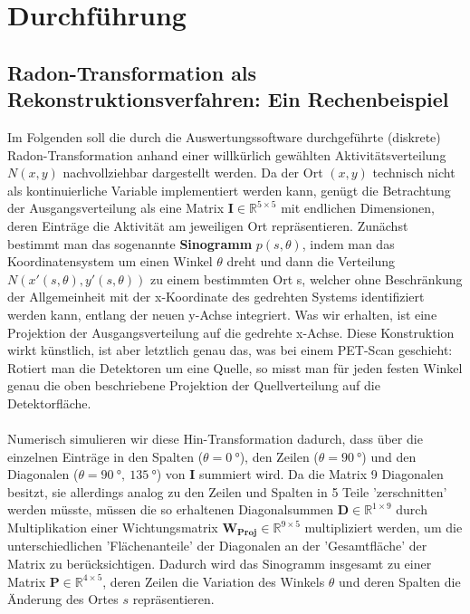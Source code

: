 \section{Durchführung}
\subsection{Radon-Transformation als Rekonstruktionsverfahren: Ein Rechenbeispiel} \label{dfs:Radon}
        Im Folgenden soll die durch die Auswertungssoftware durchgeführte (diskrete) Radon-Transformation anhand einer willkürlich gewählten Aktivitätsverteilung $N(x,y)$ nachvollziehbar dargestellt werden. Da der Ort $(x,y)$ technisch nicht als kontinuierliche Variable implementiert werden kann, genügt die Betrachtung der Ausgangsverteilung als eine Matrix $\boldsymbol{I} \in \mathbb{R}^{5 \times 5}$ mit endlichen Dimensionen, deren Einträge die Aktivität am jeweiligen Ort repräsentieren. Zunächst bestimmt man das sogenannte \textbf{Sinogramm} $p(s, \theta)$, indem man das Koordinatensystem um einen Winkel $\theta$ dreht und dann die Verteilung $N(x'(s,\theta),y'(s,\theta))$ zu einem bestimmten Ort s, welcher ohne Beschränkung der Allgemeinheit mit der x-Koordinate des gedrehten Systems identifiziert werden kann, entlang der neuen y-Achse integriert. Was wir erhalten, ist eine Projektion der Ausgangsverteilung auf die gedrehte x-Achse. Diese Konstruktion wirkt künstlich, ist aber letztlich genau das, was bei einem PET-Scan geschieht: Rotiert man die Detektoren um eine Quelle, so misst man für jeden festen Winkel genau die oben beschriebene Projektion der Quellverteilung auf die Detektorfläche.\\
        \ \\
         Numerisch simulieren wir diese Hin-Transformation dadurch, dass über die einzelnen Einträge in den Spalten ($\theta = 0\ \unit{°}$), den Zeilen ($\theta = 90\ \unit{°}$) und den Diagonalen ($\theta = 90\ \unit{°},\ 135\ \unit{°}$) von $\boldsymbol{I}$ summiert wird. Da die Matrix 9 Diagonalen besitzt, sie allerdings analog zu den Zeilen und Spalten in 5 Teile 'zerschnitten' werden müsste, müssen die so erhaltenen Diagonalsummen $\boldsymbol{D} \in \mathbb{R}^{1 \times 9}$  durch Multiplikation einer Wichtungsmatrix $\boldsymbol{W_{Proj}} \in \mathbb{R}^{9 \times 5}$ multipliziert werden, um die unterschiedlichen 'Flächenanteile' der Diagonalen an der 'Gesamtfläche' der Matrix zu berücksichtigen. Dadurch wird das Sinogramm insgesamt zu einer Matrix $\boldsymbol{P} \in \mathbb{R}^{4 \times 5}$, deren Zeilen die Variation des Winkels $\theta$ und deren Spalten die Änderung des Ortes $s$ repräsentieren.\\
